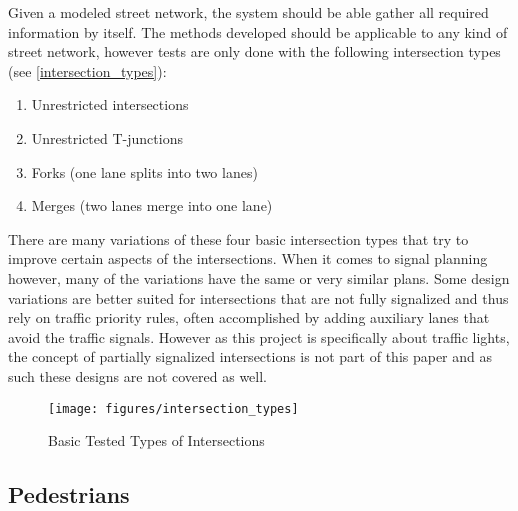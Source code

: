 Given a modeled street network, the system should be able gather all required information by itself. The methods developed should be applicable to any kind of street network, however tests are only done with the following intersection types (see \autoref{intersection_types}):

\begin{enumerate}
	\item Unrestricted intersections
	\item Unrestricted T-junctions
	\item Forks (one lane splits into two lanes)
	\item Merges (two lanes merge into one lane)
\end{enumerate}

There are many variations of these four basic intersection types that try to improve certain aspects of the intersections. When it comes to signal planning however, many of the variations have the same or very similar plans. Some design variations are better suited for intersections that are not fully signalized and thus rely on traffic priority rules, often accomplished by adding auxiliary lanes that avoid the traffic signals. However as this project is specifically about traffic lights, the concept of partially signalized intersections is not part of this paper and as such these designs are not covered as well.

\begin{figure}[ht]
	\centering
	\texttt{[image: figures/intersection\_types]}
	\caption{Basic Tested Types of Intersections}
	\label{intersection_types}
\end{figure}

\subsection*{Pedestrians}

